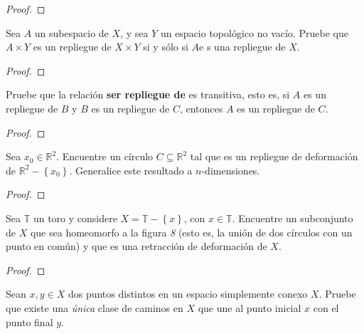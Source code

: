 \documentclass[12pt]{report}
\theoremstyle{largebreak}
\begin{document}
    \begin{proof}
        
    \end{proof}

    \begin{excer}
        Sea $A$ un subespacio de $X$, y sea $Y$ un espacio topológico no vacío. Pruebe que $A\times Y$ es un repliegue de $X\times Y$ si y sólo si $A$e s una repliegue de $X$.
    \end{excer}

    \begin{proof}
        
    \end{proof}

    \begin{excer}
        Pruebe que la relación \textbf{ser repliegue de} es transitiva, esto es, si $A$ es un repliegue de $B$ y $B$ es un repliegue de $C$, entonces $A$ es un repliegue de $C$.
    \end{excer}

    \begin{proof}
        
    \end{proof}

    \begin{excer}
        Sea $x_0\in\mathbb{R}^2$. Encuentre un círculo $C\subseteq\mathbb{R}^2$ tal que es un repliegue de deformación de $\mathbb{R}^2-\left\{x_0\right\}$. Generalice este resultado a $n$-dimensiones.
    \end{excer}

    \begin{proof}
        
    \end{proof}

    \begin{excer}
        Sea $\mathbb{T}$ un toro y considere $X=\mathbb{T}-\left\{x\right\}$, con $x\in\mathbb{T}$. Encuentre un subconjunto de $X$ que sea homeomorfo a la figura \textit{8} (esto es, la unión de dos círculos con un punto en común) y que es una retracción de deformación de $X$.
    \end{excer}

    \begin{proof}
        
    \end{proof}

    \begin{excer}
        Sean $x,y\in X$ dos puntos distintos en un espacio simplemente conexo $X$. Pruebe que existe una \textit{única} clase de caminos en $X$ que une al punto inicial $x$ con el punto final $y$.
    \end{excer}
\end{document}

